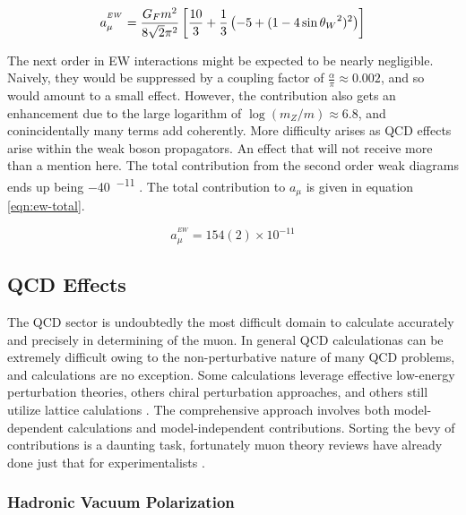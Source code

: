 \begin{equation}
\label{eqn:weak-lowest-order}
a_\mu^{^{EW}} = \frac{G_F m^2}{8\sqrt{2}\pi^2} \\
\left[\frac{10}{3} + \frac{1}{3} \left(-5 + (1 - 4\sin{\theta_W}^2)^2 \right) \right]
\end{equation}

The next order in EW interactions might be expected to be nearly negligible.  Naively, they would be suppressed by a coupling factor of $\frac{\alpha}{\pi} \approx 0.002$, and so would amount to a small effect.  However, the contribution also gets an enhancement due to the large logarithm of $\log(m_Z/m) \approx 6.8$, and conincidentally many terms add coherently.  More difficulty arises as QCD effects arise within the weak boson propagators.  An effect that will not receive more than a mention here.  The total contribution from the second order weak diagrams ends up being \SI{-40}{^{-11}} \cite{the-muon-g-2}.  The total contribution to $a_\mu$ is given in equation \ref{eqn:ew-total}. 

\begin{equation}
\label{eqn:ew-total}
a_\mu^{^{EW}} = 154(2) \times 10^{-11}
\end{equation}

\subsection{QCD Effects} \label{s-sec:theory-qcd}

The QCD sector is undoubtedly the most difficult domain to calculate accurately and precisely in determining \gmtwo of the muon.  In general QCD calculationas can be extremely difficult owing to the non-perturbative nature of many QCD problems, and \mugmtwo calculations are no exception.  Some calculations leverage effective low-energy perturbation theories, others chiral perturbation approaches, and others still utilize lattice calulations \cite{the-muon-g-2}.  The comprehensive approach involves both model-dependent calculations and model-independent contributions.  Sorting the bevy of contributions is a daunting task, fortunately muon \gmtwo theory reviews have already done just that for experimentalists \cite{the-muon-g-2, a-mu-harbinger, muon-g-2-blum, muon-g-2-hadronic-jegerlehner}.

\subsubsection{Hadronic Vacuum Polarization}

